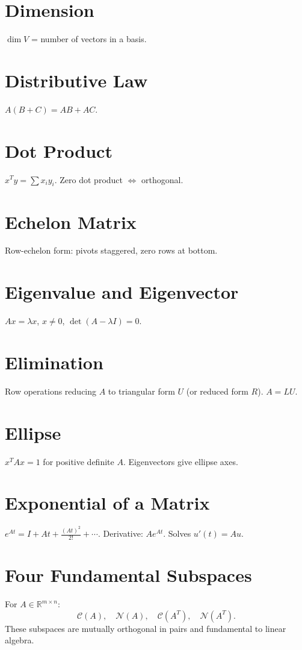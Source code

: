 \documentclass[12pt]{book}
\begin{document}
\chapter{Dimension}
$\dim V$ = number of vectors in a basis.

\chapter{Distributive Law}
$A(B+C)=AB+AC$.

\chapter{Dot Product}
$x^T y = \sum x_i y_i$. Zero dot product $\Leftrightarrow$ orthogonal.

\chapter{Echelon Matrix}
Row-echelon form: pivots staggered, zero rows at bottom.

\chapter{Eigenvalue and Eigenvector}
$Ax=\lambda x$, $x\neq 0$, $\det(A-\lambda I)=0$.

\chapter{Elimination}
Row operations reducing $A$ to triangular form $U$ (or reduced form $R$). $A=LU$.

\chapter{Ellipse}
$x^T A x=1$ for positive definite $A$. Eigenvectors give ellipse axes.

\chapter{Exponential of a Matrix}
$e^{At} = I + At + \frac{(At)^2}{2!}+\cdots$. Derivative: $A e^{At}$. Solves $u'(t)=Au$.

\chapter{Four Fundamental Subspaces}
For $A \in \mathbb{R}^{m \times n}$:
\[
\mathcal{C}(A), \quad \mathcal{N}(A), \quad \mathcal{C}(A^T), \quad \mathcal{N}(A^T).
\]
These subspaces are mutually orthogonal in pairs and fundamental to linear algebra.
\end{document}
